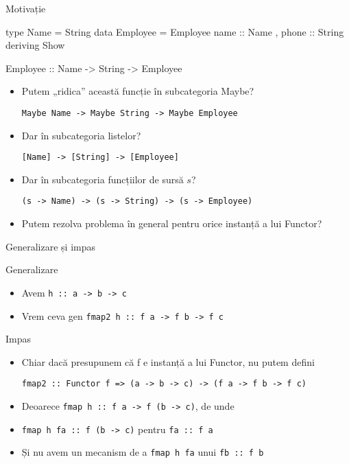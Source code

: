 \documentclass[xcolor=pdftex,romanian,colorlinks]{beamer}
\begin{document}
\begin{frame}[fragile]{Motivație}
\begin{asciihs}
type Name = String
data Employee = Employee { name    :: Name
                         , phone   :: String }
                deriving Show
\end{asciihs}                

\begin{asciihs}
Employee :: Name -> String -> Employee
\end{asciihs}

\begin{itemize}
\item Putem „ridica” această funcție în subcategoria Maybe?

\lstinline$Maybe Name -> Maybe String -> Maybe Employee$

\item Dar în subcategoria listelor?

\lstinline$[Name] -> [String] -> [Employee]$

\item Dar în subcategoria funcțiilor de sursă $s$?

\lstinline$(s -> Name) -> (s -> String) -> (s -> Employee)$

\item Putem rezolva problema în general pentru orice instanță a lui Functor?
\end{itemize}
\end{frame}

\begin{frame}[fragile]{Generalizare și impas}
\begin{block}{Generalizare}
\begin{itemize}
\item Avem \lstinline$h :: a -> b -> c$
\item Vrem ceva gen \lstinline$fmap2 h :: f a -> f b -> f c$
\end{itemize}
\end{block}

\begin{block}{Impas}
\begin{itemize}
\item Chiar dacă presupunem că f e instanță a lui Functor, nu putem defini 

\lstinline$fmap2 :: Functor f => (a -> b -> c) -> (f a -> f b -> f c)$
\item Deoarece \lstinline$fmap h :: f a -> f (b -> c)$, de unde
\item \lstinline$fmap h fa :: f (b -> c)$ pentru \lstinline$fa :: f a$
\item Și nu avem un mecanism de a  \lstinline$fmap h fa$ unui  \lstinline$fb :: f b$
\end{itemize}
\end{block}
\end{frame}
\end{document}
